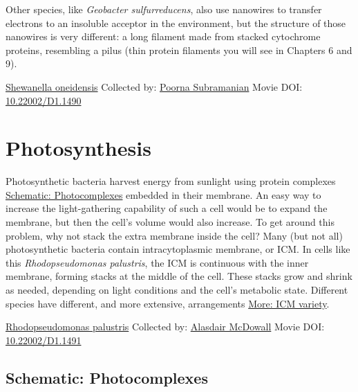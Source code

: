 \documentclass[]{tufte-book}
\begin{document}
Other species, like \emph{Geobacter sulfurreducens}, also use nanowires to transfer electrons to an insoluble acceptor in the environment, but the structure of those nanowires is very different: a long filament made from stacked cytochrome proteins, resembling a pilus (thin protein filaments you will see in Chapters 6 and 9).



\hypertarget{htmlwidget-9292f736be3c4494b8be}{}

\label{fig:4-2}\protect\hyperlink{tree}{Shewanella oneidensis} Collected by: \protect\hyperlink{poorna_subramanian}{Poorna Subramanian} Movie DOI: \href{https://doi.org/10.22002/D1.1490}{10.22002/D1.1490}

\hypertarget{photosynthesis}{%
\section{Photosynthesis}\label{photosynthesis}}

Photosynthetic bacteria harvest energy from sunlight using protein complexes \protect\hyperlink{Photocomplexes}{Schematic: Photocomplexes} embedded in their membrane. An easy way to increase the light-gathering capability of such a cell would be to expand the membrane, but then the cell's volume would also increase. To get around this problem, why not stack the extra membrane inside the cell? Many (but not all) photosynthetic bacteria contain intracytoplasmic membrane, or ICM. In cells like this \emph{Rhodopseudomonas palustris}, the ICM is continuous with the inner membrane, forming stacks at the middle of the cell. These stacks grow and shrink as needed, depending on light conditions and the cell's metabolic state. Different species have different, and more extensive, arrangements \protect\hyperlink{ICM_variety}{More: ICM variety}.



\hypertarget{htmlwidget-2abdcd86cde681a980ac}{}

\label{fig:4-3}\protect\hyperlink{tree}{Rhodopseudomonas palustris} Collected by: \protect\hyperlink{alasdair_mcdowall}{Alasdair McDowall} Movie DOI: \href{https://doi.org/10.22002/D1.1491}{10.22002/D1.1491}

\hypertarget{Photocomplexes}{%
\subsection*{Schematic: Photocomplexes}\label{Photocomplexes}}
\end{document}
